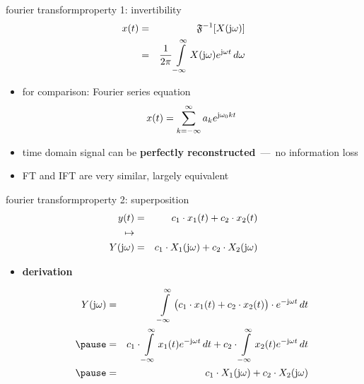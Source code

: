         \begin{frame}{fourier transform}{property 1: invertibility}
            \begin{eqnarray*}\label{eq:ift}
                x(t) &=& \mathfrak{F}^{-1}[X(\mathrm{j}\omega)]\nonumber\\
                 &=& \frac{1}{2\pi}\int\limits_{-\infty}^{\infty} X(\mathrm{j}\omega) {e}^{\mathrm{j}\omega t}\, d\omega 
            \end{eqnarray*}

            \begin{itemize}
                \item<2->   for comparison: Fourier series equation
                    \begin {equation*}
                        x(t) = \sum\limits_{k=-\infty}^{\infty} a_k {e}^{\mathrm{j}\omega_0 k t} \nonumber
                    \end {equation*}
                \item<3->   time domain signal can be \textbf{perfectly reconstructed}~---~no information loss
                \item<3->   FT and IFT are very similar, largely equivalent
            \end{itemize}
        \end{frame}	

        \begin{frame}{fourier transform}{property 2: superposition}
            \begin{eqnarray*}
                y(t) &=& c_1\cdot x_1(t) + c_2\cdot x_2(t)\nonumber\\
                \mapsto&&\nonumber\\
                Y(\mathrm{j}\omega) &=& c_1\cdot X_1(\mathrm{j}\omega) + c_2\cdot X_2(\mathrm{j}\omega)\nonumber
            \end{eqnarray*}
            \pause
            \begin{itemize}
                \item[]	\textbf{derivation}
                        \begin{footnotesize}
                            \begin{eqnarray*}
                                Y(\jom) &=& \int\limits_{-\infty}^{\infty} {\big(c_1\cdot x_1(t) + c_2\cdot x_2(t)\big)\cdot \e^{-\jom t}\, dt}\nonumber\\
                                \pause
                                &=& c_1\cdot \int\limits_{-\infty}^{\infty} {x_1(t)  \e^{-\jom t}\, dt} + c_2\cdot \int\limits_{-\infty}^{\infty} {x_2(t) \e^{-\jom t}\, dt}\nonumber\\
                                \pause
                                &=& c_1\cdot X_1(\jom) + c_2\cdot X_2(\jom) 
                            \end{eqnarray*}
                        \end{footnotesize}
            \end{itemize}
        \end{frame}	

